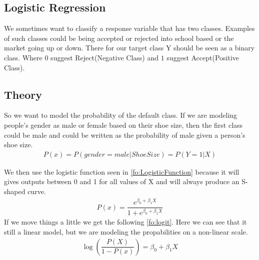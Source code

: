 \subsection{Logistic Regression}\label{sc:logisticRegression}
We sometimes want to classify a response variable that has two classes. Examples of such classes could be being accepted or rejected into school based or the market going up or down. There for our target class Y should be seen as a binary class. Where $0$ suggest Reject(Negative Class) and $1$ suggest Accept(Positive Class).
\subsection{Theory}
So we want to model the probability of the default class. If we are modeling people’s gender as male or female based on their shoe size, then the first class could be male and could be written as the probability of male given a person’s shoe size.
\begin{align}\label{fo:logit}
P(x) = P(gender=male|ShoeSize) = P(Y=1|X)
\end{align}

We then use the logistic function seen in \ref{fo:LogisticFunction} because it will gives outputs between 0 and 1 for all values of X and will always produce an S-shaped curve.
\begin{align}\label{fo:LogisticFunction}
P(x) = \dfrac{ e^{\beta_0 + \beta_1 X}}{  1 + e^{\beta_0 + \beta_1 X}}
\end{align}
 If we move things a little we get the following \ref{fo:logit}. Here we can see that it still a linear model, but we are modeling the propabilities on a non-linear scale.
\begin{align}\label{fo:logit}
\log( \dfrac{ P(X)}{1-P(x)} ) = \beta_0 + \beta_1 X
\end{align}

